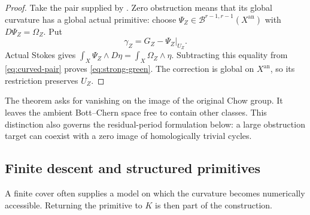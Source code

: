 \documentclass[11pt]{article}
\theoremstyle{definition}
\numberwithin{equation}{section}
\newcommand{\an}{\mathrm{an}}
\newcommand{\B}{\mathcal B}
\begin{document}
\begin{proof}
Take the pair supplied by . Zero obstruction means that its global curvature has a global actual primitive: choose $\Psi_Z\in\B^{r-1,r-1}(X^{\an})$ with $D\Psi_Z=\Omega_Z$. Put
\[
 \gamma_Z=G_Z-\Psi_Z|_{U_Z}.
\]
Actual Stokes gives $\int_X\Psi_Z\wedge D\eta=\int_X\Omega_Z\wedge\eta$. Subtracting this equality from \eqref{eq:curved-pair} proves \eqref{eq:strong-green}. The correction is global on $X^{\an}$, so its restriction preserves $U_Z$.
\end{proof}

The theorem asks for vanishing on the image of the original Chow group. It leaves the ambient Bott--Chern space free to contain other classes. This distinction also governs the residual-period formulation below: a large obstruction target can coexist with a zero image of homologically trivial cycles.

\subsection{Finite descent and structured primitives}\label{sec:finite-descent}

A finite cover often supplies a model on which the curvature becomes numerically accessible. Returning the primitive to $K$ is then part of the construction.
\end{document}
